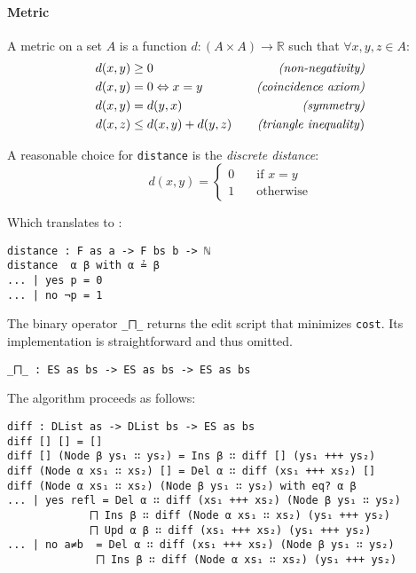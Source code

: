 \documentclass[../Thesis.tex]{subfiles}
\begin{document}
	\paragraph{Metric}
	
	A metric on a set $A$ is a function $d	 : (A \times A) \rightarrow \mathbb{R}$
	such that $\forall x, y, z \in A$:
	\begin{align*}
		d(x, y) &\geq 0 \quad &\mbox{\emph{{(non-negativity)}}}\\ 
		d(x, y) &= 0 \Leftrightarrow x = y \quad &\mbox{\emph{(coincidence axiom)}} \\		
		d(x, y) &= d(y, x) \quad &\mbox{\emph{(symmetry)}}\\
		d(x, z) &\leq d(x, y) + d(y, z) \quad &\mbox{\emph{(triangle inequality})}
	\end{align*}
	
	A reasonable choice for \texttt{distance} is the \emph{discrete distance}:
	\[ d(x, y) = 
		\begin{cases} 
			0 \quad &\mbox{if } x = y \\
			1 \quad &\mbox {otherwise}		
		\end{cases} \]
		
	Which translates to : 		
\begin{verbatim}
distance : F as a -> F bs b -> ℕ
distance  α β with α ≟ β
... | yes p = 0
... | no ¬p = 1
\end{verbatim}
	
	The binary operator \texttt{\_⨅\_} returns the edit script that minimizes 	
	\texttt{cost}. Its implementation is straightforward and thus omitted.

\begin{verbatim}
_⨅_ : ES as bs -> ES as bs -> ES as bs
\end{verbatim}

	The algorithm proceeds as follows:

\begin{verbatim}
diff : DList as -> DList bs -> ES as bs
diff [] [] = []
diff [] (Node β ys₁ ∷ ys₂) = Ins β ∷ diff [] (ys₁ +++ ys₂)
diff (Node α xs₁ ∷ xs₂) [] = Del α ∷ diff (xs₁ +++ xs₂) []
diff (Node α xs₁ ∷ xs₂) (Node β ys₁ ∷ ys₂) with eq? α β
... | yes refl = Del α ∷ diff (xs₁ +++ xs₂) (Node β ys₁ ∷ ys₂) 
             ⨅ Ins β ∷ diff (Node α xs₁ ∷ xs₂) (ys₁ +++ ys₂) 
             ⨅ Upd α β ∷ diff (xs₁ +++ xs₂) (ys₁ +++ ys₂)
... | no a≠b  = Del α ∷ diff (xs₁ +++ xs₂) (Node β ys₁ ∷ ys₂) 
              ⨅ Ins β ∷ diff (Node α xs₁ ∷ xs₂) (ys₁ +++ ys₂)
\end{verbatim}
	
\end{document}
